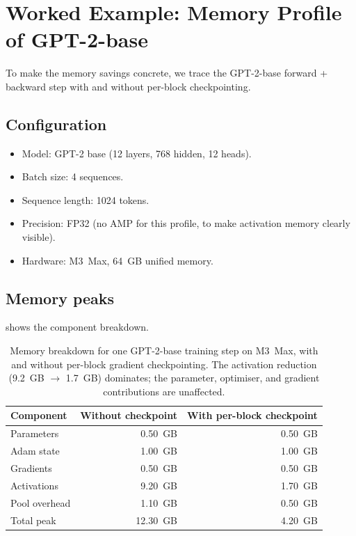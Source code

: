 \section{Worked Example: Memory Profile of GPT-2-base}
\label{sec:gradient_checkpointing:gpt2_profile}

To make the memory savings concrete, we trace the GPT-2-base
forward + backward step with and without per-block checkpointing.

\subsection{Configuration}
\label{ssec:gradient_checkpointing:config}

\begin{itemize}
  \item Model: GPT-2 base (12 layers, 768 hidden, 12 heads).
  \item Batch size: 4 sequences.
  \item Sequence length: 1024 tokens.
  \item Precision: FP32 (no AMP for this profile, to make
    activation memory clearly visible).
  \item Hardware: M3~Max, 64~GB unified memory.
\end{itemize}

\subsection{Memory peaks}
\label{ssec:gradient_checkpointing:peaks}

 shows the
component breakdown.

\begin{table}[t]
\centering
\small
\begin{tabular}{lrr}
\toprule
Component & Without checkpoint & With per-block checkpoint \\
\midrule
Parameters    & 0.50~GB & 0.50~GB \\
Adam state    & 1.00~GB & 1.00~GB \\
Gradients     & 0.50~GB & 0.50~GB \\
Activations   & 9.20~GB & 1.70~GB \\
Pool overhead & 1.10~GB & 0.50~GB \\
\midrule
Total peak    & 12.30~GB & 4.20~GB \\
\bottomrule
\end{tabular}
\caption[GPT-2-base memory profile.]{Memory breakdown for one
GPT-2-base training step on M3~Max, with and without per-block
gradient checkpointing. The activation reduction (9.2~GB $\to$
1.7~GB) dominates; the parameter, optimiser, and gradient
contributions are unaffected.}
\label{tab:gradient_checkpointing:gpt2_peaks}
\end{table}

